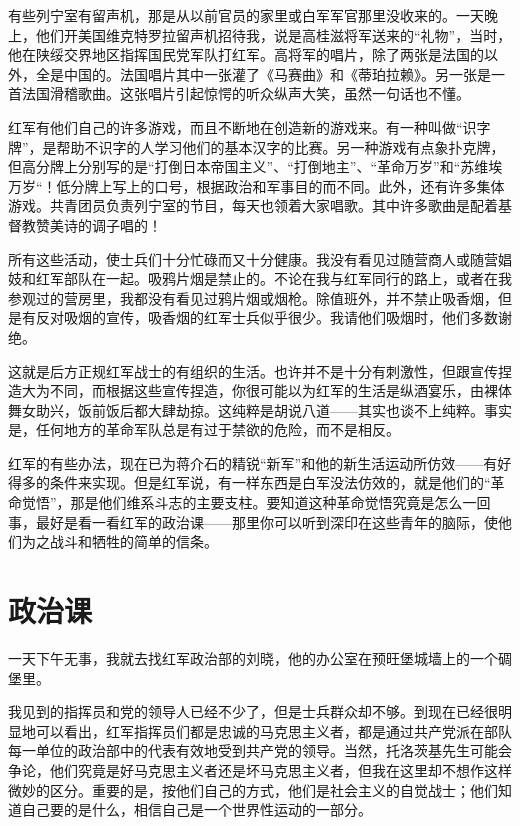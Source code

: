 \documentclass[10pt]{book}
\begin{document}
有些列宁室有留声机，那是从以前官员的家里或白军军官那里没收来的。一天晚上，他们开美国维克特罗拉留声机招待我，说是高桂滋将军送来的“礼物”，当时，他在陕绥交界地区指挥国民党军队打红军。高将军的唱片，除了两张是法国的以外，全是中国的。法国唱片其中一张灌了《马赛曲》和《蒂珀拉赖》。另一张是一首法国滑稽歌曲。这张唱片引起惊愕的听众纵声大笑，虽然一句话也不懂。

红军有他们自己的许多游戏，而且不断地在创造新的游戏来。有一种叫做“识字牌”，是帮助不识字的人学习他们的基本汉字的比赛。另一种游戏有点象扑克牌，但高分牌上分别写的是“打倒日本帝国主义”、“打倒地主”、“革命万岁”和“苏维埃万岁“！低分牌上写上的口号，根据政治和军事目的而不同。此外，还有许多集体游戏。共青团员负责列宁室的节目，每天也领着大家唱歌。其中许多歌曲是配着基督教赞美诗的调子唱的！

所有这些活动，使士兵们十分忙碌而又十分健康。我没有看见过随营商人或随营娼妓和红军部队在一起。吸鸦片烟是禁止的。不论在我与红军同行的路上，或者在我参观过的营房里，我都没有看见过鸦片烟或烟枪。除值班外，并不禁止吸香烟，但是有反对吸烟的宣传，吸香烟的红军士兵似乎很少。我请他们吸烟时，他们多数谢绝。

这就是后方正规红军战士的有组织的生活。也许并不是十分有刺激性，但跟宣传捏造大为不同，而根据这些宣传捏造，你很可能以为红军的生活是纵酒宴乐，由裸体舞女助兴，饭前饭后都大肆劫掠。这纯粹是胡说八道——其实也谈不上纯粹。事实是，任何地方的革命军队总是有过于禁欲的危险，而不是相反。

红军的有些办法，现在已为蒋介石的精锐“新军”和他的新生活运动所仿效——有好得多的条件来实现。但是红军说，有一样东西是白军没法仿效的，就是他们的“革命觉悟”，那是他们维系斗志的主要支柱。要知道这种革命觉悟究竟是怎么一回事，最好是看一看红军的政治课——那里你可以听到深印在这些青年的脑际，使他们为之战斗和牺牲的简单的信条。

\section{政治课}

一天下午无事，我就去找红军政治部的刘晓，他的办公室在预旺堡城墙上的一个碉堡里。

我见到的指挥员和党的领导人已经不少了，但是士兵群众却不够。到现在已经很明显地可以看出，红军指挥员们都是忠诚的马克思主义者，都是通过共产党派在部队每一单位的政治部中的代表有效地受到共产党的领导。当然，托洛茨基先生可能会争论，他们究竟是好马克思主义者还是坏马克思主义者，但我在这里却不想作这样微妙的区分。重要的是，按他们自己的方式，他们是社会主义的自觉战士；他们知道自己要的是什么，相信自己是一个世界性运动的一部分。
\end{document}
